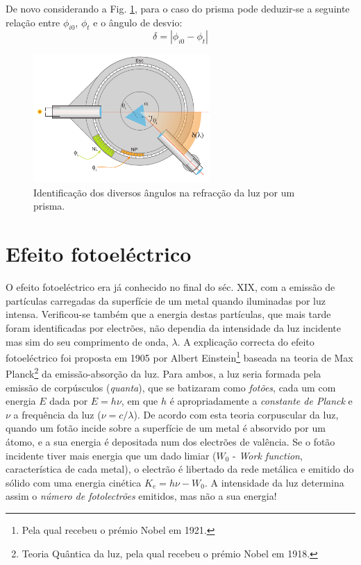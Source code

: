 \documentclass[12pt,a4paper,oneside]{paper}
\begin{document}
De novo considerando a Fig. \ref{fig:babinet3}, para o caso do prisma pode deduzir-se a seguinte relação entre
$\phi_{i0}$, $\phi_t$ e o ângulo de desvio:
\begin{equation}
\delta=|\phi_{i0}-\phi_t |
\end{equation}

\begin{figure}[h]
	\centering 
	\includegraphics[width=0.6\textwidth]{./planck_images/Babinet3}
	\caption{Identificação dos diversos ângulos na refracção da luz por um prisma.
	\label{fig:babinet3}} 
\end{figure}




\newpage


\section{\sf Efeito fotoeléctrico}
O efeito fotoeléctrico era já conhecido no final do séc. XIX, com a emissão  de partículas carregadas da superfície de um
metal quando iluminadas por luz intensa. Verificou-se também que a energia destas partículas, que mais tarde foram identificadas
por electrões, não dependia da intensidade da luz incidente mas sim do  seu comprimento de onda, $\lambda$.  A explicação correcta
do efeito fotoeléctrico foi proposta em 1905 por Albert Einstein\footnote{Pela qual recebeu o prémio Nobel em 1921.} baseada na
teoria de Max Planck\footnote{Teoria Quântica da luz, pela qual recebeu o prémio Nobel em 1918.} da emissão-absorção da luz.
Para ambos, a luz seria formada pela emissão de  corpúsculos (\emph{quanta}), que se batizaram como \emph{fotões}, cada um
com energia $E$  dada por $E = h \nu$, em que $h$ é apropriadamente a \emph{constante de Planck} e $\nu$ a frequência da luz
($\nu=c/\lambda$).  De acordo com esta teoria corpuscular da luz, quando um fotão incide sobre a superfície de um metal é
absorvido por um átomo, e a sua energia é depositada num dos electrões de valência.
 Se o fotão incidente tiver mais energia que um dado limiar ($W_0$ - \emph{Work function}, característica de cada metal),
 o  electrão é libertado da rede metálica e emitido do sólido com uma energia cinética $K_e = h\nu - W_0$.
A intensidade da luz determina assim o \emph{número de fotolectrões} emitidos, mas não a sua energia!
\end{document}
